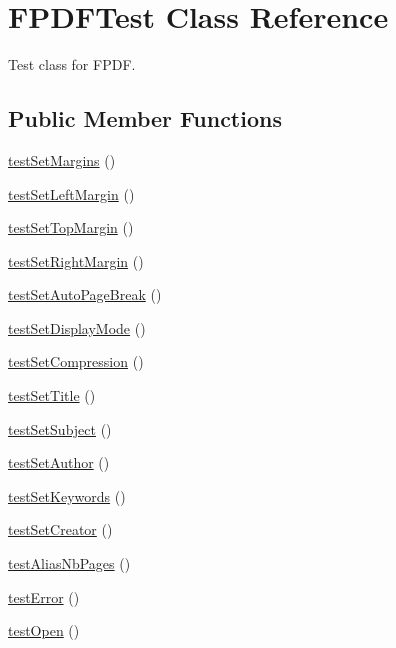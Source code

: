 \hypertarget{class_f_p_d_f_test}{
\section{FPDFTest Class Reference}
\label{class_f_p_d_f_test}
}


Test class for FPDF.  


\subsection*{Public Member Functions}
\begin{DoxyCompactItemize}
\item 
\hyperlink{class_f_p_d_f_test_a6865f0deae430866543f9cdf88d4843c}{testSetMargins} ()
\item 
\hyperlink{class_f_p_d_f_test_a34ec44d5f8dcf5bc3a6b6339255dfd1c}{testSetLeftMargin} ()
\item 
\hyperlink{class_f_p_d_f_test_abadbc3bb2d33de5cf0c683b6079381df}{testSetTopMargin} ()
\item 
\hyperlink{class_f_p_d_f_test_aa3d7e46363f0f6c3a7ee5d336999aa47}{testSetRightMargin} ()
\item 
\hyperlink{class_f_p_d_f_test_a538458c657bb68bc14fa0867fb5f26d2}{testSetAutoPageBreak} ()
\item 
\hyperlink{class_f_p_d_f_test_ae36fa8e2ac120c6047095132f6702b99}{testSetDisplayMode} ()
\item 
\hyperlink{class_f_p_d_f_test_a8ebed7f7815638ce4ab1e59c5b330989}{testSetCompression} ()
\item 
\hyperlink{class_f_p_d_f_test_a71aa9259f5ade449ddbe4e05316eff14}{testSetTitle} ()
\item 
\hyperlink{class_f_p_d_f_test_aabc48b3677f12ba2ed44aff54514cd64}{testSetSubject} ()
\item 
\hyperlink{class_f_p_d_f_test_a994fab439102f0b00d4e6338f8f43338}{testSetAuthor} ()
\item 
\hyperlink{class_f_p_d_f_test_a7a1a10bdc85a6038cf3272689d0e8b9c}{testSetKeywords} ()
\item 
\hyperlink{class_f_p_d_f_test_a3f1c075d3b84a45f8aa62a51df8e9313}{testSetCreator} ()
\item 
\hyperlink{class_f_p_d_f_test_a6ee64c62a92b0448d22a55994bd1a3cd}{testAliasNbPages} ()
\item 
\hyperlink{class_f_p_d_f_test_a3e018a623c05ac45934f76f3a84ef6e5}{testError} ()
\item 
\hyperlink{class_f_p_d_f_test_a3b5ce735913ae531cbdeaadbfa062241}{testOpen} ()

\end{DoxyCompactItemize}
